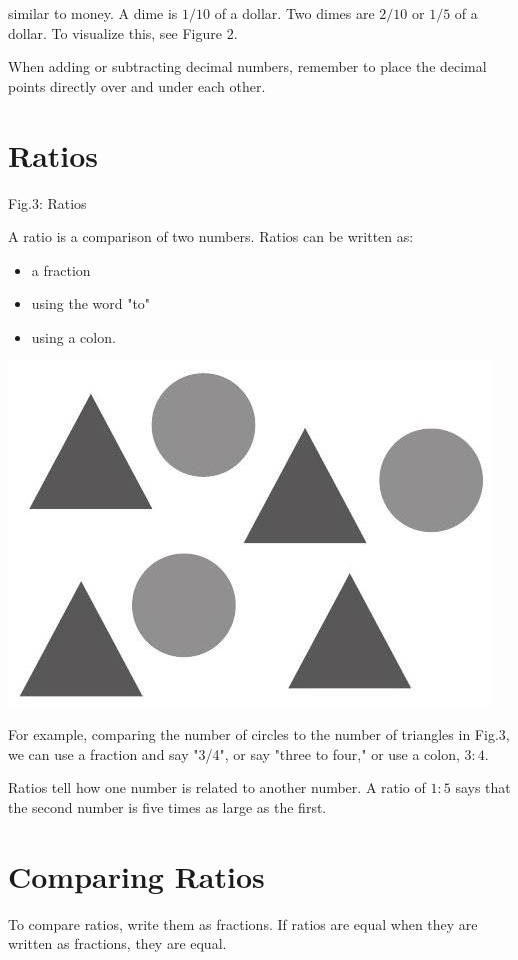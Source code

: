 \documentclass[10pt]{article}
\begin{document}
similar to money. A dime is $1 / 10$ of a dollar. Two dimes are $2 / 10$ or $1 / 5$ of a dollar. To visualize this, see Figure $2 .$

When adding or subtracting decimal numbers, remember to place the decimal points directly over and under each other.

\section{Ratios}
Fig.3: Ratios

A ratio is a comparison of two numbers. Ratios can be written as:

\begin{itemize}
  \item a fraction

  \item using the word "to"

  \item using a colon.

\end{itemize}
\includegraphics[max width=\textwidth]{2022_09_16_4d34b76b97ee13a67df7g-02}

For example, comparing the number of circles to the number of triangles in Fig.3, we can use a fraction and say "3/4", or say "three to four," or use a colon, $3: 4$.

Ratios tell how one number is related to another number. A ratio of $1: 5$ says that the second number is five times as large as the first.

\section{Comparing Ratios}
To compare ratios, write them as fractions. If ratios are equal when they are written as fractions, they are equal.
\end{document}
